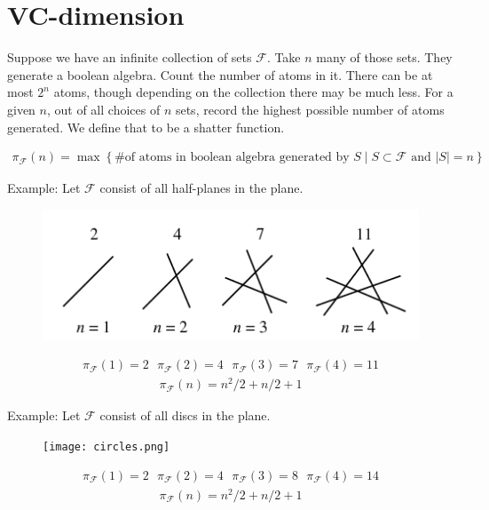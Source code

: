 \documentclass{amsart}
\newcommand{\F}{\mathcal F}
\newcommand{\curly}[1]{\left\{ #1 \right\}}
\begin{document}
\section{VC-dimension}

Suppose we have an infinite collection of sets $\F$.
Take $n$ many of those sets.
They generate a boolean algebra.
Count the number of atoms in it.
There can be at most $2^n$ atoms, though depending on the collection there may be much less.
For a given $n$, out of all choices of $n$ sets, record the highest possible number of atoms generated.
We define that to be a shatter function.

\begin{Definition}
	\begin{align*}
		\pi_\F(n) = \max \curly{ \text {\# of atoms in boolean algebra generated by $S$} \mid S \subset \F \text{ and } |S| = n}
	\end{align*}
\end{Definition}

Example: Let $\F$ consist of all half-planes in the plane.
\begin{figure}[p]
	\centering
	\includegraphics[scale=0.75]{lines.png}
\end{figure}
\begin{align*}
	\pi_\F(1) = 2 \ \ \  \pi_\F(2) = 4 \ \ \  \pi_\F(3) = 7  \ \ \ \pi_\F(4) = 11
\end{align*}
\begin{align*}
	\pi_\F(n) = n^2/2 + n/2 + 1
\end{align*}

Example: Let $\F$ consist of all discs in the plane.
\begin{figure}[p]
	\centering
	\texttt{[image: circles.png]}
\end{figure}
\begin{align*}
	\pi_\F(1) = 2 \ \ \  \pi_\F(2) = 4 \ \ \  \pi_\F(3) = 8  \ \ \ \pi_\F(4) = 14
\end{align*}
\begin{align*}
	\pi_\F(n) = n^2/2 + n/2 + 1
\end{align*}
\end{document}
